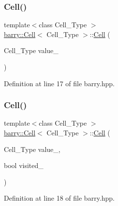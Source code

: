 \mbox{\label{classbarry_1_1_cell_a228ee63eccb0250954f7540a8b946c78}} 
\subsubsection{\texorpdfstring{Cell()}{Cell()}\hspace{0.1cm}{\footnotesize\ttfamily [2/6]}}
{\footnotesize\ttfamily template$<$class Cell\+\_\+\+Type $>$ \\
\hyperlink{classbarry_1_1_cell}{barry\+::\+Cell}$<$ Cell\+\_\+\+Type $>$\+::\hyperlink{classbarry_1_1_cell}{Cell} (\begin{DoxyParamCaption}\item[{Cell\+\_\+\+Type}]{value\+\_\+ }\end{DoxyParamCaption})\hspace{0.3cm}{\ttfamily [inline]}}



Definition at line 17 of file barry.\+hpp.

\mbox{\label{classbarry_1_1_cell_a421e81ef4364c2d8f2c27a291d4bc830}} 
\subsubsection{\texorpdfstring{Cell()}{Cell()}\hspace{0.1cm}{\footnotesize\ttfamily [3/6]}}
{\footnotesize\ttfamily template$<$class Cell\+\_\+\+Type $>$ \\
\hyperlink{classbarry_1_1_cell}{barry\+::\+Cell}$<$ Cell\+\_\+\+Type $>$\+::\hyperlink{classbarry_1_1_cell}{Cell} (\begin{DoxyParamCaption}\item[{Cell\+\_\+\+Type}]{value\+\_\+,  }\item[{bool}]{visited\+\_\+ }\end{DoxyParamCaption})\hspace{0.3cm}{\ttfamily [inline]}}



Definition at line 18 of file barry.\+hpp.

\mbox{\label{classbarry_1_1_cell_a2500924b447d4d881916749041974d81}} 
